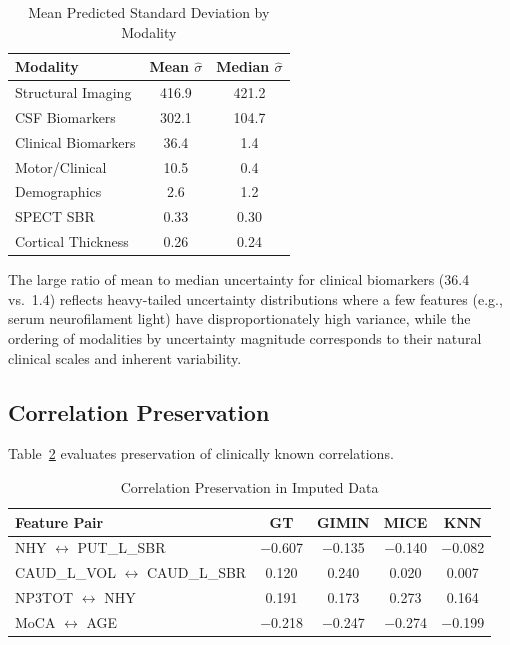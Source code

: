 \documentclass[journal,twoside,web]{ieeecolor}
\begin{document}
\begin{table}[t]
\centering
\caption{Mean Predicted Standard Deviation by Modality}
\label{tab:uncertainty_modality}
\begin{tabular}{lcc}
\toprule
\textbf{Modality} & \textbf{Mean $\hat{\sigma}$} & \textbf{Median $\hat{\sigma}$} \\
\midrule
Structural Imaging  & 416.9 & 421.2 \\
CSF Biomarkers      & 302.1 & 104.7 \\
Clinical Biomarkers & 36.4  & 1.4   \\
Motor/Clinical      & 10.5  & 0.4   \\
Demographics        & 2.6   & 1.2   \\
SPECT SBR           & 0.33  & 0.30  \\
Cortical Thickness  & 0.26  & 0.24  \\
\bottomrule
\end{tabular}
\end{table}

The large ratio of mean to median uncertainty for clinical biomarkers (36.4 vs.\ 1.4) reflects heavy-tailed uncertainty distributions where a few features (e.g., serum neurofilament light) have disproportionately high variance, while the ordering of modalities by uncertainty magnitude corresponds to their natural clinical scales and inherent variability.

\subsection{Correlation Preservation}

Table~\ref{tab:correlations} evaluates preservation of clinically known correlations.

\begin{table}[t]
\centering
\caption{Correlation Preservation in Imputed Data}
\label{tab:correlations}
\begin{tabular}{lcccc}
\toprule
\textbf{Feature Pair} & \textbf{GT} & \textbf{GIMIN} & \textbf{MICE} & \textbf{KNN} \\
\midrule
NHY $\leftrightarrow$ PUT\_L\_SBR       & $-$0.607 & $-$0.135 & $-$0.140 & $-$0.082 \\
CAUD\_L\_VOL $\leftrightarrow$ CAUD\_L\_SBR & 0.120  & 0.240   & 0.020   & 0.007   \\
NP3TOT $\leftrightarrow$ NHY               & 0.191  & 0.173   & 0.273   & 0.164   \\
MoCA $\leftrightarrow$ AGE                 & $-$0.218 & $-$0.247 & $-$0.274 & $-$0.199 \\
\bottomrule
\end{tabular}
\end{table}
\end{document}
